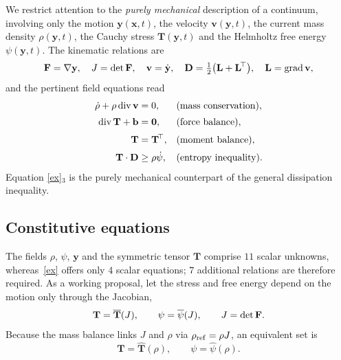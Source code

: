 We restrict attention to the \emph{purely mechanical} description of a
continuum, involving only the motion
\(\mathbf{y}(\mathbf{x},t)\), the velocity
\(\mathbf{v}(\mathbf{y},t)\), the current mass density
\(\rho(\mathbf{y},t)\), the Cauchy stress
\(\mathbf{T}(\mathbf{y},t)\) and the Helmholtz free energy
\(\psi(\mathbf{y},t)\).
The kinematic relations are
\begin{equation}
	\mathbf{F} = \nabla\mathbf{y}, 
	\quad 
	J = \det\mathbf{F}, 
	\quad 
	\mathbf{v} = \dot{\mathbf{y}}, 
	\quad
	\mathbf{D} = \tfrac12\bigl(\mathbf{L}+\mathbf{L}^{\!\top}\bigr), 
	\quad 
	\mathbf{L} = \operatorname{grad}\mathbf{v},
\end{equation}
and the pertinent field equations read
\begin{equation}\label{ex}
		\begin{aligned}
			\dot\rho+\rho\operatorname{div}\mathbf{v} &=0, & & \text{(mass conservation)}, \\[2pt]
			\operatorname{div}\mathbf{T} + \mathbf{b} &= \mathbf{0}, & & \text{(force balance)}, \\[2pt]
			\mathbf{T} &= \mathbf{T}^{\!\top}, & & \text{(moment balance)}, \\[2pt]
			\mathbf{T}\cdot\mathbf{D} &\ge \rho\dot{\psi}, & & \text{(entropy inequality)}.
	\end{aligned}
\end{equation}
Equation \eqref{ex}\(_3\) is the purely mechanical counterpart of the
general dissipation inequality.


\subsection{Constitutive equations}

The fields \(\rho\), \(\psi\), \(\mathbf{y}\) and the symmetric tensor
\(\mathbf{T}\) comprise \(11\) scalar unknowns, whereas~\eqref{ex} offers
only \(4\) scalar equations; \(7\) additional relations are therefore
required.  As a working proposal, let the stress and free energy depend
on the motion only through the Jacobian,
\[
\mathbf{T} = \overline{\mathbf{T}}(J),
\qquad
\psi      = \overline{\psi}(J),
\qquad
J = \det\mathbf{F}.
\]
Because the mass balance links \(J\) and \(\rho\) via
\(\rho_{\rm ref} = \rho J\), an equivalent set is
\begin{equation}\label{conex}
	\mathbf{T} = \widehat{\mathbf{T}}(\rho),
	\qquad
	\psi      = \widehat{\psi}(\rho).
\end{equation}

